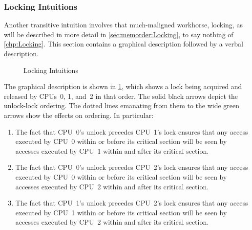 \subsubsection{Locking Intuitions}
\label{sec:memorder:Locking Intuitions}

Another transitive intuition involves that much-maligned workhorse,
locking, as will be described in more detail in
\cref{sec:memorder:Locking},
to say nothing of
\cref{chp:Locking}.
This section contains a graphical description followed by a verbal
description.

\begin{figure}
\centering
{}
\caption{Locking Intuitions}
\label{fig:memorder:Locking Intuitions}
\end{figure}

The graphical description is shown in
\cref{fig:memorder:Locking Intuitions},
which shows a lock being acquired and released by CPUs~0, 1, and~2
in that order.
The solid black arrows depict the unlock-lock ordering.
The dotted lines emanating from them to the wide green arrows
show the effects on ordering.
In particular:

\begin{enumerate}
\item	The fact that CPU~0's unlock precedes CPU~1's lock ensures that
	any access executed by CPU~0 within or before its critical
	section will be seen by accesses executed by CPU~1 within
	and after its critical section.
\item	The fact that CPU~0's unlock precedes CPU~2's lock ensures that
	any access executed by CPU~0 within or before its critical
	section will be seen by accesses executed by CPU~2 within
	and after its critical section.
\item	The fact that CPU~1's unlock precedes CPU~2's lock ensures that
	any access executed by CPU~1 within or before its critical
	section will be seen by accesses executed by CPU~2 within and
	after its critical section.
\end{enumerate}

